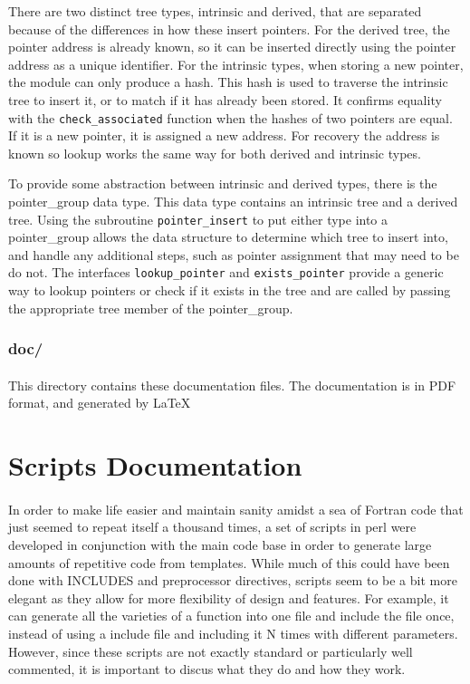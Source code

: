 \documentclass{article}
\begin{document}
There are two distinct tree types, intrinsic and derived, that are separated because of the differences in how these insert pointers. For the derived tree, the pointer address is already known, so it can be inserted directly using the pointer address as a unique identifier. For the intrinsic types, when storing a new pointer, the module can only produce a hash. This hash is used to traverse the intrinsic tree to insert it, or to match if it has already been stored. It confirms equality with the \texttt{check\_associated} function when the hashes of two pointers are equal. If it is a new pointer, it is assigned a new address. For recovery the address is known so lookup works the same way for both derived and intrinsic types.

To provide some abstraction between intrinsic and derived types, there is the pointer\_group data type. This data type contains an intrinsic tree and a derived tree. Using the subroutine \texttt{pointer\_insert} to put either type into a pointer\_group allows the data structure to determine which tree to insert into, and handle any additional steps, such as pointer assignment that may need to be do not. The interfaces \texttt{lookup\_pointer} and \texttt{exists\_pointer} provide a generic way to lookup pointers or check if it exists in the tree and are called by passing the appropriate tree member of the pointer\_group.

\subsubsection{doc/}
\paragraph{}
This directory contains these documentation files. The documentation is in PDF format, and generated by \LaTeX

\section{Scripts Documentation}
\paragraph{}
In order to make life easier and maintain sanity amidst a sea of Fortran code that just seemed to repeat itself a thousand times, a set of scripts in perl were developed in conjunction with the main code base in order to generate large amounts of repetitive code from templates. While much of this could have been done with INCLUDES and preprocessor directives, scripts seem to be a bit more elegant as they allow for more flexibility of design and features. For example, it can generate all the varieties of a function into one file and include the file once, instead of using a include file and including it N times with different parameters. However, since these scripts are not exactly standard or particularly well commented, it is important to discus what they do and how they work.
\end{document}
